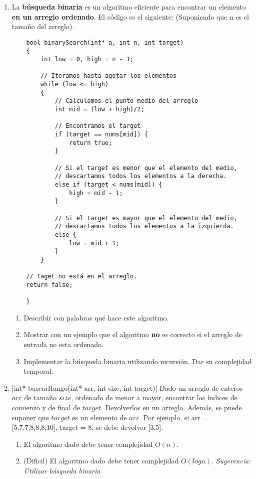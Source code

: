 \documentclass[titlepage,oneside]{book}
\begin{document}
\begin{enumerate}
        \item La \textbf{búsqueda binaria} es un algoritmo eficiente para encontrar un elemento \textbf{en un arreglo ordenado}. El código es el siguiente: (Suponiendo que n es el tamaño del arreglo).

            \begin{verbatim}
    bool binarySearch(int* a, int n, int target)
    {
        int low = 0, high = n - 1;
        
        // Iteramos hasta agotar los elementos
        while (low <= high)
        {
            // Calculamos el punto medio del arreglo
            int mid = (low + high)/2;
            
            // Encontramos el target
            if (target == nums[mid]) {
                return true;
            }
     
            // Si el target es menor que el elemento del medio, 
            // descartamos todos los elementos a la derecha.
            else if (target < nums[mid]) {
                high = mid - 1;
            }
     
            // Si el target es mayor que el elemento del medio, 
            // descartamos todos los elementos a la izquierda.
            else {
                low = mid + 1;
            }
        }
 
    // Taget no está en el arreglo.
    return false;

    }
    \end{verbatim} 

    \begin{enumerate}
        \item Describir con palabras qué hace este algoritmo.
        \item Mostrar con un ejemplo que el algoritmo \textbf{no} es correcto si el arreglo de entrada no esta ordenado.
        \item Implementar la búsqueda binaria utilizando recursión. Dar su complejidad temporal.
    \end{enumerate}

        
    \item{}|int* buscarRango(int* arr, int size, int target)|
    Dado un arreglo de enteros $arr$ de tamaño $size$, ordenado de menor a mayor, encontrar los índices de comienzo y de final de $target$. Devolverlos en un arreglo. Además, se puede suponer que $target$ es un elemento de $arr$.
    \newline
    Por ejemplo, si arr = [5,7,7,8,8,8,10], target = 8, se debe devolver [3,5].
    \begin{enumerate}
        \item El algoritmo dado debe tener complejidad $O(n)$.
        \item (Dificil) El algoritmo dado debe tener complejidad $O(log{}n)$.\newline
        \textit{Sugerencia: Utilizar búsqueda binaria}
    \end{enumerate}

        
        
    \end{enumerate}
    
\end{document}
